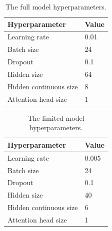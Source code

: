         \begin{table}[ht!]
        \begin{center}
        \caption{The full model hyperparameters.
        \label{tab:full_params}}
        \vspace{0.5cm}
        \begin{tabular}{|l|l|}
        \hline
        \textbf{Hyperparameter} & \textbf{Value} \\ \hline
        Learning rate            & 0.01         \\ \hline
        Batch size              & 24            \\ \hline
        Dropout                 & 0.1            \\ \hline
        Hidden size            & 64         \\ \hline
        Hidden continuous size & 8         \\ \hline
        Attention head size    & 1         \\ \hline
        \end{tabular}
        
        \end{center}
        \end{table}
        
        \begin{table}[ht!]
        \begin{center}
        \caption{The limited model hyperparameters.
        \label{tab:lim_params}}
        \vspace{0.5cm}
        \begin{tabular}{|l|l|}
        \hline
        \textbf{Hyperparameter} & \textbf{Value} \\ \hline
        Learning rate            & 0.005         \\ \hline
        Batch size              & 24            \\ \hline
        Dropout                 & 0.1            \\ \hline
        Hidden size            & 40         \\ \hline
        Hidden continuous size & 6         \\ \hline
        Attention head size    & 1         \\ \hline
        \end{tabular}
        
        \end{center}
        \end{table}
    
